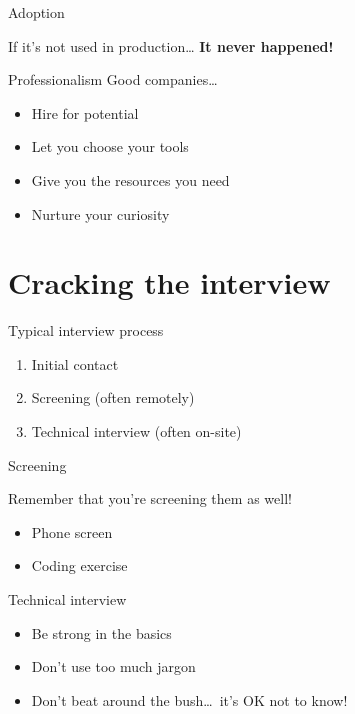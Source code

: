 \begin{frame}{Adoption}
    \begin{center}
        {\large%
         If it's not used in production\ldots}
        \vfill\pause
        {\Large\bf%
         It never happened!}
    \end{center}
\end{frame}

\begin{frame}{Professionalism}
    \large%
    Good companies\ldots
    \begin{itemize}
        \setlength{\itemsep}{\medskipamount}
        \item Hire for potential
        \item Let you choose your tools
        \item Give you the resources you need
        \item Nurture your curiosity
    \end{itemize}
\end{frame}

\section{Cracking the interview}

\begin{frame}{Typical interview process}
    \large%
    \begin{enumerate}
        \setlength{\itemsep}{\medskipamount}
        \item Initial contact
        \item Screening (often remotely)
        \item Technical interview (often on\hyp{}site)
    \end{enumerate}
\end{frame}

\begin{frame}{Screening}
    \begin{center}
        \large%
        Remember that you're screening them as well!
    \end{center}
    \vfill
    \begin{itemize}
        \setlength{\itemsep}{\medskipamount}
        \item Phone screen
        \item Coding exercise
    \end{itemize}
\end{frame}

\begin{frame}{Technical interview}
    \large%
    \begin{itemize}
        \setlength{\itemsep}{\medskipamount}
        \item Be strong in the basics
        \item Don't use too much jargon
        \item Don't beat around the bush\ldots~it's OK not to know!
    \end{itemize}
\end{frame}

